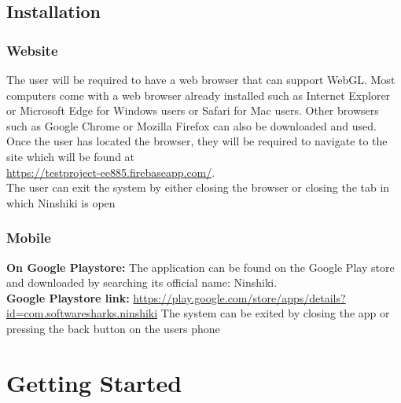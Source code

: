 \documentclass[a4paper, 12pt]{article}
\begin{document}
\subsection{Installation}
\subsubsection{Website}
The user will be required to have a web browser that can support WebGL. Most computers come with a web browser already installed such as Internet Explorer or Microsoft Edge for Windows users or Safari for Mac users. Other browsers such as Google Chrome or Mozilla Firefox can also be downloaded and used. Once the user has located the browser, they will be required to navigate to the site which will be found at \\ \url{https://testproject-ee885.firebaseapp.com/}.\\
The user can exit the system by either closing the browser or closing the tab in which Ninshiki is open\linebreak

\subsubsection{Mobile}
\textbf{On Google Playstore:} The application can be found on the Google Play store and downloaded by searching its official name: Ninshiki.\\
\textbf{Google Playstore link:} \url{https://play.google.com/store/apps/details?id=com.softwaresharks.ninshiki}
\newline
\newline
The system can be exited by closing the app or pressing the back button on the users phone

\section{Getting Started}
\end{document}
